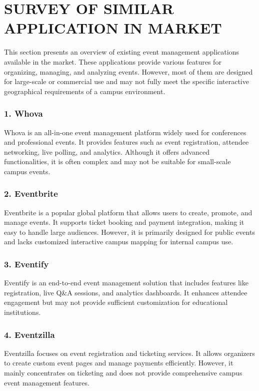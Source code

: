\documentclass[10pt]{report}
\begin{document}
\chapter{SURVEY OF SIMILAR APPLICATION IN MARKET} 

This section presents an overview of existing event management applications available in the market. These applications provide various features for organizing, managing, and analyzing events. However, most of them are designed for large-scale or commercial use and may not fully meet the specific interactive geographical requirements of a campus environment.

\subsection*{1. Whova}
Whova is an all-in-one event management platform widely used for conferences and professional events. It provides features such as event registration, attendee networking, live polling, and analytics. Although it offers advanced functionalities, it is often complex and may not be suitable for small-scale campus events.

\subsection*{2. Eventbrite}
Eventbrite is a popular global platform that allows users to create, promote, and manage events. It supports ticket booking and payment integration, making it easy to handle large audiences. However, it is primarily designed for public events and lacks customized interactive campus mapping for internal campus use.

\subsection*{3. Eventify}
Eventify is an end-to-end event management solution that includes features like registration, live Q\&A sessions, and analytics dashboards. It enhances attendee engagement but may not provide sufficient customization for educational institutions.

\subsection*{4. Eventzilla}
Eventzilla focuses on event registration and ticketing services. It allows organizers to create custom event pages and manage payments efficiently. However, it mainly concentrates on ticketing and does not provide comprehensive campus event management features.
\end{document}
